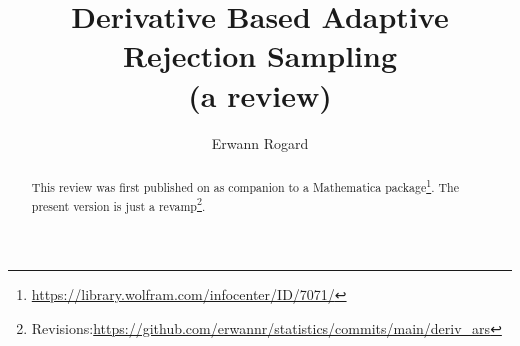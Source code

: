 \documentclass[11pt]{article}
\title{Derivative Based Adaptive Rejection Sampling\\ (a review)}
\author{Erwann Rogard}
\date{\ThisDate}
\begin{document}
\maketitle


\begin{abstract}This review was first published on  as companion to a Mathematica package\footnote{\url{https://library.wolfram.com/infocenter/ID/7071/}}. The present version is just a revamp\footnote{Revisions:\url{https://github.com/erwannr/statistics/commits/main/deriv_ars}}.
\end{abstract}
\end{document}
